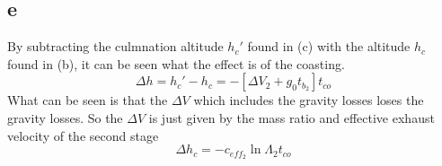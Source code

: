 \subsection{e}
By subtracting the culmnation altitude $h_c'$ found in (c) with the altitude $h_c$ found in (b), it can be seen what the effect is of the coasting.
\begin{equation}
\Delta h = h_c'-h_c = -[\Delta V_2 + g_0t_{b_2}]t_{co}
\end{equation}
What can be seen is that the $\Delta V$ which includes the gravity losses loses the gravity losses. So the $\Delta V$ is just given by the mass ratio and effective exhaust velocity of the second stage
\begin{equation}
\Delta h_c = -c_{{eff}_2}\ln \Lambda_2t_{co}
\end{equation}
